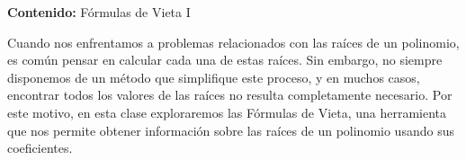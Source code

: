 {\Large\textbf{Contenido:} Fórmulas de Vieta I}

Cuando nos enfrentamos a problemas relacionados con las raíces de un polinomio, es común pensar en calcular cada una de estas raíces.
Sin embargo, no siempre disponemos de un método que simplifique este proceso, y en muchos casos, encontrar todos los valores de las raíces no resulta completamente necesario.
Por este motivo, en esta clase exploraremos las Fórmulas de Vieta, una herramienta que nos permite obtener información sobre las raíces de un polinomio usando sus coeficientes.